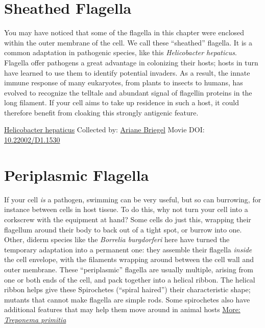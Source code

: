 \documentclass[]{tufte-book}
\begin{document}
\hypertarget{sheathed-flagella}{%
\section{Sheathed Flagella}\label{sheathed-flagella}}

You may have noticed that some of the flagella in this chapter were enclosed within the outer membrane of the cell. We call these ``sheathed'' flagella. It is a common adaptation in pathogenic species, like this \emph{Helicobacter hepaticus}. Flagella offer pathogens a great advantage in colonizing their hosts; hosts in turn have learned to use them to identify potential invaders. As a result, the innate immune response of many eukaryotes, from plants to insects to humans, has evolved to recognize the telltale and abundant signal of flagellin proteins in the long filament. If your cell aims to take up residence in such a host, it could therefore benefit from cloaking this strongly antigenic feature.



\hypertarget{htmlwidget-71ad32c75528490240d9}{}

\label{fig:6-6}\protect\hyperlink{tree}{Helicobacter hepaticus} Collected by: \protect\hyperlink{ariane_briegel}{Ariane Briegel} Movie DOI: \href{https://doi.org/10.22002/D1.1530}{10.22002/D1.1530}

\hypertarget{periplasmic-flagella}{%
\section{Periplasmic Flagella}\label{periplasmic-flagella}}

If your cell \emph{is} a pathogen, swimming can be very useful, but so can burrowing, for instance between cells in host tissue. To do this, why not turn your cell into a corkscrew with the equipment at hand? Some cells do just this, wrapping their flagellum around their body to back out of a tight spot, or burrow into one. Other, diderm species like the \emph{Borrelia burgdorferi} here have turned the temporary adaptation into a permanent one: they assemble their flagella \emph{inside} the cell envelope, with the filaments wrapping around between the cell wall and outer membrane. These ``periplasmic'' flagella are usually multiple, arising from one or both ends of the cell, and pack together into a helical ribbon. The helical ribbon helps give these Spirochetes (``spiral haired'') their characteristic shape; mutants that cannot make flagella are simple rods. Some spirochetes also have additional features that may help them move around in animal hosts \protect\hyperlink{ux2aTreponema_primitiaux2a}{More: \emph{Treponema primitia}}
\end{document}
